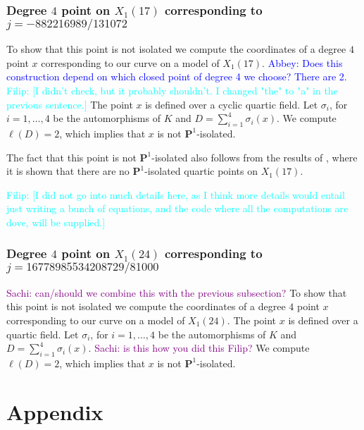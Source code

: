 \documentclass[11pt,reqno]{amsart}
\theoremstyle{plain}
\theoremstyle{definition}
\newcommand{\PP}{\mathbf P}
\newcommand{\filip}[1]{{\textcolor{cyan}{Filip: [#1]}}}
\newcommand{\abbey}[1]{\textcolor{blue}{Abbey: #1}}
\newcommand{\sachi}[1]{\textcolor{purple}{Sachi: #1}}
\newcommand{\fedit}[1]{{\color{cyan} #1}}
\begin{document}
\subsubsection{Degree $4$ point on $X_1(17)$ corresponding to $j=-882216989/131072$}
To show that this point is not isolated we compute the coordinates of \fedit{a} degree $4$ point $x$ corresponding to our curve on a model of $X_1(17)$. \abbey{Does this construction depend on which closed point of degree 4 we choose? There are 2.} \filip{I didn't check, but it probably shouldn't. I changed "the" to "a" in the previous sentence.} The point $x$ is defined over a cyclic quartic field. Let $\sigma_i$, for $i=1,\ldots, 4$ be the automorphisms of $K$ and $D=\sum_{i=1}^4\sigma_i(x)$. We compute $\ell(D)=2$, which implies that $x$ is not $\PP^1$-isolated. 

The fact that this point is not $\PP^1$-isolated also follows from the results of \cite[Proposition 6.7]{DerickxMazurKamienny}, where it is shown that there are no $\PP^1$-isolated quartic points on $X_1(17)$.


\filip{I did not go into much details here, as I think more details would entail just writing a bunch of equations, and the code where all the computations are dove, will be supplied.}

\subsubsection{Degree $4$ point on $X_1(24)$ corresponding to $j=16778985534208729/81000$}
\sachi{can/should we combine this with the previous subsection?}
To show that this point is not isolated we compute the coordinates of a degree $4$ point $x$ corresponding to our curve on a model of $X_1(24)$. The point $x$ is defined over a quartic field. Let $\sigma_i$, for $i=1,\ldots, 4$ be the automorphisms of $K$ and $D=\sum_{i=1}^4\sigma_i(x)$. \sachi{is this how you did this Filip?}
We compute $\ell(D)=2$, which implies that $x$ is not $\PP^1$-isolated. 

\newpage
\section*{Appendix}
\label{appendix}
\end{document}
